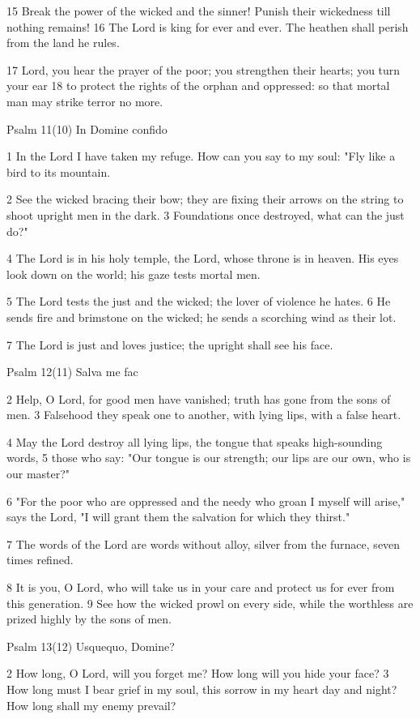 15 Break the power of the wicked and the sinner!
Punish their wickedness till nothing remains!
16 The Lord is king for ever and ever.
The heathen shall perish from the land he rules.

17 Lord, you hear the prayer of the poor;
you strengthen their hearts; you turn your ear
18 to protect the rights of the orphan and oppressed:
so that mortal man may strike terror no more.



Psalm 11(10) In Domine confido

1 In the Lord I have taken my refuge.
How can you say to my soul:
"Fly like a bird to its mountain.

2 See the wicked bracing their bow;
they are fixing their arrows on the string
to shoot upright men in the dark.
3 Foundations once destroyed, what can the just do?"

4 The Lord is in his holy temple,
the Lord, whose throne is in heaven.
His eyes look down on the world;
his gaze tests mortal men.

5 The Lord tests the just and the wicked;
the lover of violence he hates.
6 He sends fire and brimstone on the wicked;
he sends a scorching wind as their lot.

7 The Lord is just and loves justice;
the upright shall see his face.


Psalm 12(11) Salva me fac

2 Help, O Lord, for good men have vanished;
truth has gone from the sons of men.
3 Falsehood they speak one to another,
with lying lips, with a false heart.

4 May the Lord destroy all lying lips,
the tongue that speaks high-sounding words,
5 those who say: "Our tongue is our strength;
our lips are our own, who is our master?"

6 "For the poor who are oppressed and the needy who groan
I myself will arise," says the Lord,
"I will grant them the salvation for which they thirst."

7 The words of the Lord are words without alloy,
silver from the furnace, seven times refined.

8 It is you, O Lord, who will take us in your care
and protect us for ever from this generation.
9 See how the wicked prowl on every side,
while the worthless are prized highly by the sons of men.


Psalm 13(12) Usquequo, Domine?

2 How long, O Lord, will you forget me?
How long will you hide your face?
3 How long must I bear grief in my soul,
this sorrow in my heart day and night?
How long shall my enemy prevail?

